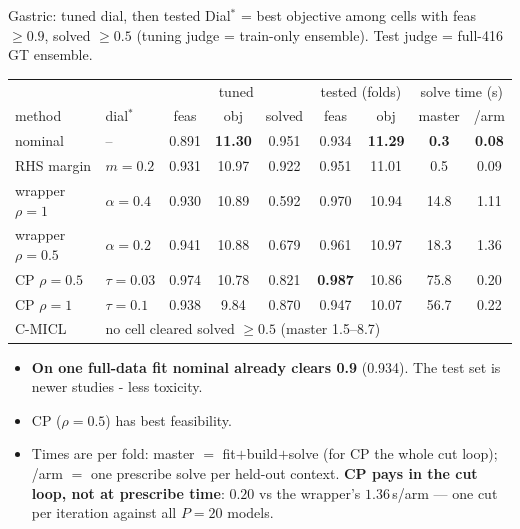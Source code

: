 \documentclass{beamer}
\begin{document}
\begin{frame}{Gastric: tuned dial, then tested}
    \footnotesize
    Dial$^\ast$ = best objective among cells with feas $\ge 0.9$, solved $\ge 0.5$
    (tuning judge = train-only ensemble). Test judge = full-416 GT ensemble.
    \vspace{0.5em}
    {\scriptsize\setlength{\tabcolsep}{3.5pt}
    \begin{tabular}{llccc|cc|cc}
        \toprule
        & & \multicolumn{3}{c|}{tuned} & \multicolumn{2}{c|}{tested (folds)}
          & \multicolumn{2}{c}{solve time (s)} \\
        method & dial$^\ast$ & feas & obj & solved & feas & obj & master & /arm \\
        \midrule
        nominal              & --             & 0.891 & \textbf{11.30} & 0.951 & 0.934 & \textbf{11.29} & \textbf{0.3} & \textbf{0.08} \\
        RHS margin           & $m=0.2$        & 0.931 & 10.97 & 0.922 & 0.951 & 11.01 & 0.5 & 0.09 \\
        wrapper $\rho{=}1$   & $\alpha=0.4$   & 0.930 & 10.89 & 0.592 & 0.970 & 10.94 & 14.8 & 1.11 \\
        wrapper $\rho{=}0.5$ & $\alpha=0.2$   & 0.941 & 10.88 & 0.679 & 0.961 & 10.97 & 18.3 & 1.36 \\
        CP $\rho{=}0.5$      & $\tau=0.03$    & 0.974 & 10.78 & 0.821 & \textbf{0.987} & 10.86 & 75.8 & 0.20 \\
        CP $\rho{=}1$        & $\tau=0.1$     & 0.938 & 9.84  & 0.870 & 0.947 & 10.07 & 56.7 & 0.22 \\
        C-MICL               & \multicolumn{8}{l}{no cell cleared solved $\ge 0.5$ \quad (master 1.5--8.7)} \\
        \bottomrule
    \end{tabular}}
    \vspace{0.3em}
    \begin{itemize}
        \item \textbf{On one full-data fit nominal already clears 0.9} (0.934).
              The test set is newer studies - less toxicity.
        \item CP ($\rho=0.5$) has best feasibility.
        \item Times are per fold: master $=$ fit${+}$build${+}$solve (for CP the whole
              cut loop); /arm $=$ one prescribe solve per held-out context.
              \textbf{CP pays in the cut loop, not at prescribe time}: $0.20$ vs the
              wrapper's $1.36$\,s/arm --- one cut per iteration against all $P{=}20$ models.
    \end{itemize}
\end{frame}
\end{document}
